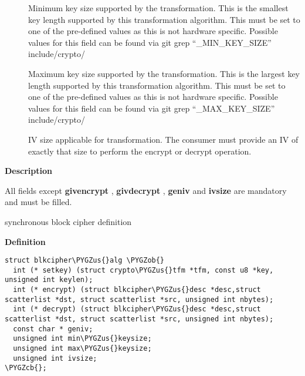 \documentclass[a4paper,8pt,english]{sphinxmanual}
\def\PYGZus{\char`\_}
\def\PYGZob{\char`\{}
\def\PYGZcb{\char`\}}
\begin{document}
\begin{description}
\item[{}] \leavevmode
Minimum key size supported by the transformation. This is the
smallest key length supported by this transformation algorithm.
This must be set to one of the pre-defined values as this is
not hardware specific. Possible values for this field can be
found via git grep ``\_MIN\_KEY\_SIZE'' include/crypto/

\item[{}] \leavevmode
Maximum key size supported by the transformation. This is the
largest key length supported by this transformation algorithm.
This must be set to one of the pre-defined values as this is
not hardware specific. Possible values for this field can be
found via git grep ``\_MAX\_KEY\_SIZE'' include/crypto/

\item[{}] \leavevmode
IV size applicable for transformation. The consumer must provide an
IV of exactly that size to perform the encrypt or decrypt operation.

\end{description}

\textbf{Description}

All fields except \textbf{givencrypt} , \textbf{givdecrypt} , \textbf{geniv} and \textbf{ivsize} are
mandatory and must be filled.

\begin{fulllineitems}
\label{crypto/api-skcipher:c.blkcipher_alg}
synchronous block cipher definition

\end{fulllineitems}


\textbf{Definition}

\begin{Verbatim}[commandchars=\\\{\}]
struct blkcipher\PYGZus{}alg \PYGZob{}
  int (* setkey) (struct crypto\PYGZus{}tfm *tfm, const u8 *key, unsigned int keylen);
  int (* encrypt) (struct blkcipher\PYGZus{}desc *desc,struct scatterlist *dst, struct scatterlist *src, unsigned int nbytes);
  int (* decrypt) (struct blkcipher\PYGZus{}desc *desc,struct scatterlist *dst, struct scatterlist *src, unsigned int nbytes);
  const char * geniv;
  unsigned int min\PYGZus{}keysize;
  unsigned int max\PYGZus{}keysize;
  unsigned int ivsize;
\PYGZcb{};
\end{Verbatim}
\end{document}
